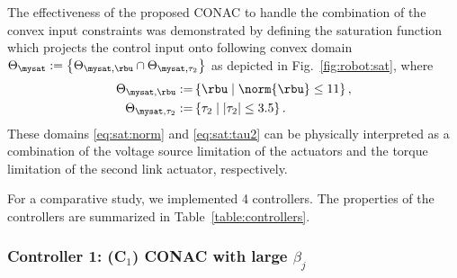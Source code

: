 \documentclass[lettersize,journal]{IEEEtran}
\begin{document}
The effectiveness of the proposed CONAC to handle the combination of the convex input constraints was demonstrated by defining the saturation function which projects the control input onto following convex domain $\Theta_{\mysat}:=\left\{\Theta_{\mysat, {\rbu}}\cap\Theta_{\mysat, {\tau_2}}\right\}$ as depicted in Fig.~\ref{fig:robot:sat}, where
\begin{subequations}
    \begin{align}
        \Theta_{\mysat, {\rbu}}
        :=&
        \left\{
            \rbu
            \mid
            \norm{\rbu} \le 
            11
        \right\}
        \label{eq:sat:norm}
        ,
        \\
        \Theta_{\mysat, {\tau_2}}
        :=&
        \left\{
            \tau_2
            \mid
            \vert{\tau_2}\vert \le 
            3.5
        \right\}
        .
        \label{eq:sat:tau2}
    \end{align}
    \label{eq:sat}
\end{subequations}
These domains \eqref{eq:sat:norm} and \eqref{eq:sat:tau2} can be physically interpreted as a combination of the voltage source limitation of the actuators and the torque limitation of the second link actuator, respectively.

\hfill

For a comparative study, we implemented 4 controllers.
The properties of the controllers are summarized in Table~\ref{table:controllers}.

\subsubsection*{Controller 1: (C$_1$) CONAC with large $\beta_j$}
\end{document}
